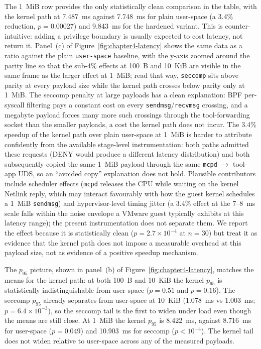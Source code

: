 The 1~MiB row provides the only statistically clean comparison in the table, with the kernel path at \num{7.487}~ms against \num{7.748}~ms for plain user-space (a 3.4\% reduction, $p = 0.00027$) and \num{9.843}~ms for the hardened variant.
This is counter-intuitive: adding a privilege boundary is usually expected to cost latency, not return it.
Panel~(c) of Figure~\ref{fig:chapter4-latency} shows the same data as a ratio against the plain \texttt{user-space} baseline, with the y-axis zoomed around the parity line so that the sub-4\% effects at 100~B and 10~KiB are visible in the same frame as the larger effect at 1~MiB; read that way, \texttt{seccomp} sits above parity at every payload size while the kernel path crosses below parity only at 1~MiB.
The seccomp penalty at large payloads has a clean explanation: BPF per-syscall filtering pays a constant cost on every \texttt{sendmsg}/\texttt{recvmsg} crossing, and a megabyte payload forces many more such crossings through the tool-forwarding socket than the smaller payloads, a cost the kernel path does not incur.
The 3.4\% speedup of the kernel path over plain user-space at 1~MiB is harder to attribute confidently from the available stage-level instrumentation: both paths admitted these requests (DENY would produce a different latency distribution) and both subsequently copied the same 1~MiB payload through the same \texttt{mcpd} $\to$ tool-app UDS, so an ``avoided copy'' explanation does not hold.
Plausible contributors include scheduler effects (\texttt{mcpd} releases the CPU while waiting on the kernel Netlink reply, which may interact favourably with how the guest kernel schedules a 1~MiB \texttt{sendmsg}) and hypervisor-level timing jitter (a 3.4\% effect at the 7--8~ms scale falls within the noise envelope a VMware guest typically exhibits at this latency range); the present instrumentation does not separate them.
We report the effect because it is statistically clean ($p = 2.7 \times 10^{-4}$ at $n = 30$) but treat it as evidence that the kernel path does not impose a measurable overhead at this payload size, not as evidence of a positive speedup mechanism.

The $p_{95}$ picture, shown in panel~(b) of Figure~\ref{fig:chapter4-latency}, matches the means for the kernel path: at both 100~B and 10~KiB the kernel $p_{95}$ is statistically indistinguishable from user-space ($p = 0.51$ and $p = 0.16$).
The seccomp $p_{95}$ already separates from user-space at 10~KiB (\num{1.078}~ms vs \num{1.003}~ms; $p = 6.4 \times 10^{-3}$), so the seccomp tail is the first to widen under load even though the means are still close.
At 1~MiB the kernel $p_{95}$ is \num{8.422}~ms, against \num{8.716}~ms for user-space ($p = 0.049$) and \num{10.903}~ms for seccomp ($p < 10^{-4}$).
The kernel tail does not widen relative to user-space across any of the measured payloads.

